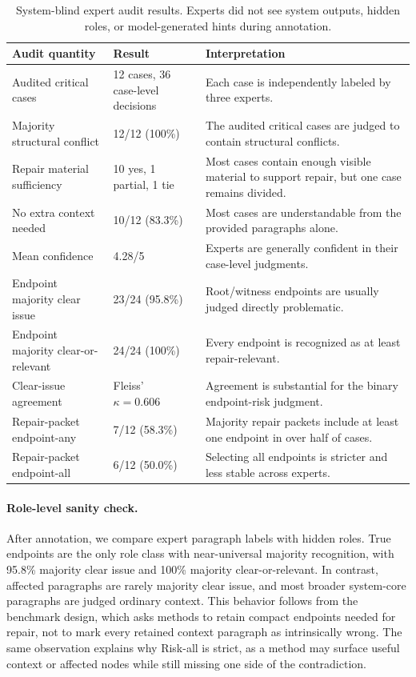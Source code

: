 \documentclass[11pt]{article}
\newcommand{\riskall}{Risk-all}
\begin{document}
\begin{table}[t]
\centering
\small
\setlength{\tabcolsep}{4pt}
\begin{tabular}{p{}p{}p{}}
\toprule
Audit quantity & Result & Interpretation \\
\midrule
Audited critical cases & 12 cases, 36 case-level decisions & Each case is independently labeled by three experts. \\
Majority structural conflict & 12/12 (100\%) & The audited critical cases are judged to contain structural conflicts. \\
Repair material sufficiency & 10 yes, 1 partial, 1 tie & Most cases contain enough visible material to support repair, but one case remains divided. \\
No extra context needed & 10/12 (83.3\%) & Most cases are understandable from the provided paragraphs alone. \\
Mean confidence & 4.28/5 & Experts are generally confident in their case-level judgments. \\
Endpoint majority clear issue & 23/24 (95.8\%) & Root/witness endpoints are usually judged directly problematic. \\
Endpoint majority clear-or-relevant & 24/24 (100\%) & Every endpoint is recognized as at least repair-relevant. \\
Clear-issue agreement & Fleiss' $\kappa=0.606$ & Agreement is substantial for the binary endpoint-risk judgment. \\
Repair-packet endpoint-any & 7/12 (58.3\%) & Majority repair packets include at least one endpoint in over half of cases. \\
Repair-packet endpoint-all & 6/12 (50.0\%) & Selecting all endpoints is stricter and less stable across experts. \\
\bottomrule
\end{tabular}
\caption{System-blind expert audit results.  Experts did not see system outputs, hidden roles, or model-generated hints during annotation.}
\label{tab:expert_audit_results}
\end{table}

\paragraph{Role-level sanity check.}
After annotation, we compare expert paragraph labels with hidden roles.  True endpoints are the only role class with near-universal majority recognition, with 95.8\% majority clear issue and 100\% majority clear-or-relevant.  In contrast, affected paragraphs are rarely majority clear issue, and most broader system-core paragraphs are judged ordinary context.  This behavior follows from the benchmark design, which asks methods to retain compact endpoints needed for repair, not to mark every retained context paragraph as intrinsically wrong.  The same observation explains why \riskall{} is strict, as a method may surface useful context or affected nodes while still missing one side of the contradiction.
\end{document}
